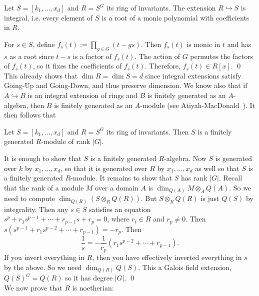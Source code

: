  
 \begin{lem}
 Let $S=[k_1,\ldots,x_d]$ and $R=S^G$ its ring of invariants. The extension $R \hookrightarrow S$ is integral, i.e. every element of $S$ is a root of a monic polynomial with coefficients in $R$. 
 \end{lem}

\pf For $s \in S$, define $f_s(t):= \prod_{g \in G} (t-gs)$. Then $f_s(t)$ is monic in $t$ and has $s$ as a root since $t-s$ is a factor of $f_s(t)$. The action of $G$ permutes the factors of $f_s(t)$, so it fixes the coefficients of $f_s(t)$. Therefore, $f_s(t) \in R[x]$. \qed \\


This already shows that $\dim R= \dim S= d$ since integral extensions satisfy Going-Up and Going-Down, and thus preserve dimension. We know also that if $A \hookrightarrow B$ is an integral extension of rings and $B$ is finitely generated as an $A$-algebra, then $B$ is finitely generated as an $A$-module (see Atiyah-MacDonald~\cite[Ch.~5]{atiyahmac}). It then follows that


\begin{cor}
Let $S=[k_1,\ldots,x_d]$ and $R=S^G$ its ring of invariants. Then $S$ is a finitely generated $R$-module of rank $|G|$.
\end{cor}

\pf It is enough to show that $S$ is a finitely generated $R$-algebra. Now $S$ is generated over $k$ by $x_1,\ldots,x_d$, so that it is generated over $R$ by $x_1, \ldots, x_d$ as well so that $S$ is a finitely generated $R$-module. It remains to show that $S$ has rank $|G|$. Recall that the rank of a module $M$ over a domain $A$ is $\dim_{Q(A)} M \otimes_A Q(A)$. So we need to compute $\dim_{Q(R)}(S \otimes_R Q(R))$.  But $S \otimes_R Q(R)$ is just $Q(S)$ by integrality. Then any $s \in S$ satisfies an equation $s^p + r_1s^{p-1}+\cdots+r_{p-1}s+r_p=0$, where $r_i \in R$ and $r_p \neq 0$. Then $s(s^{p-1}+r_1s^{p-2}+\cdots+r_{p-1})= -r_p$. Then
	\[
	\dfrac{1}{s}= -\dfrac{1}{r_p} \left( r_1 s^{p-2} + \cdots + r_{p-1} \right).
	\]
If you invert everything in $R$, then you have effectively inverted everything in $s$ by the above. So we need $\dim_{Q(R)} Q(S)$. This a Galois field extension, $Q(S)^G= Q(R)$ so it has degree $|G|$. \qed \\


We now prove that $R$ is noetherian: \\

